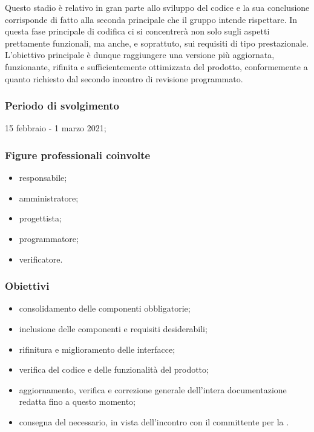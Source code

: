 Questo stadio è relativo in gran parte allo sviluppo del codice e la sua conclusione corrisponde di fatto alla seconda  principale che il gruppo \Gruppo{} intende rispettare. In questa fase principale di codifica ci si concentrerà non solo sugli aspetti prettamente funzionali, ma anche, e soprattuto, sui requisiti di tipo prestazionale. L'obiettivo principale è dunque raggiungere una versione più aggiornata, funzionante, rifinita e sufficientemente ottimizzata del prodotto, conformemente a quanto richiesto dal secondo incontro di revisione programmato.
        
        \subsubsection{Periodo di svolgimento}
        15 febbraio - 1 marzo 2021;
        
        \subsubsection{Figure professionali coinvolte}
            \begin{itemize}
                \item responsabile;
                \item amministratore;
                \item progettista;
                \item programmatore;
                \item verificatore.
            \end{itemize}

        \subsubsection{Obiettivi}
        \begin{itemize}
            \item consolidamento delle componenti obbligatorie;
            \item inclusione delle componenti e requisiti desiderabili;
            \item rifinitura e miglioramento delle interfacce;
            \item verifica del codice e delle funzionalità del prodotto;
            \item aggiornamento, verifica e correzione generale dell'intera documentazione redatta fino a questo momento;
            \item consegna del  necessario, in vista dell'incontro con il committente per la \RP{}.
        \end{itemize}
